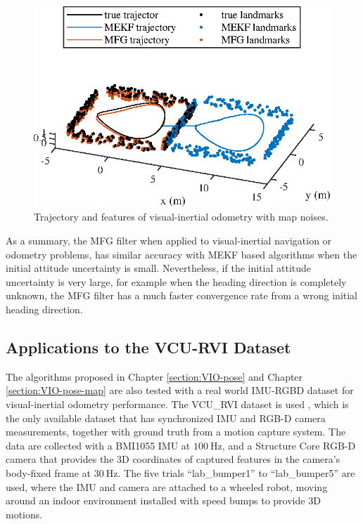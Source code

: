 \begin{figure}
	\centering
	\includegraphics[scale=1.2]{figures/VIO-map-filter-trajectory2}
	\caption{Trajectory and features of visual-inertial odometry with map noises.}
	\label{fig:VIO-map-filter-trajectory2}
\end{figure}

As a summary, the MFG filter when applied to visual-inertial navigation or odometry problems, has similar accuracy with MEKF based algorithms when the initial attitude uncertainty is small.
Nevertheless, if the initial attitude uncertainty is very large, for example when the heading direction is completely unknown, the MFG filter has a much faster convergence rate from a wrong initial heading direction.

\subsection{Applications to the VCU-RVI Dataset}

The algorithms proposed in Chapter \ref{section:VIO-pose} and Chapter \ref{section:VIO-pose-map} are also tested with a real world IMU-RGBD dataset for visual-inertial odometry performance.
The VCU\_RVI dataset is used \cite{zhang2020vcu}, which is the only available dataset that has synchronized IMU and RGB-D camera measurements, together with ground truth from a motion capture system.
The data are collected with a BMI1055 IMU at $\SI{100}{\hertz}$, and a Structure Core RGB-D camera that provides the 3D coordinates of captured features in the camera's body-fixed frame at $\SI{30}{\hertz}$.
The five trials ``lab\_bumper1'' to ``lab\_bumper5'' are used, where the IMU and camera are attached to a wheeled robot, moving around an indoor environment installed with speed bumps to provide 3D motions.

